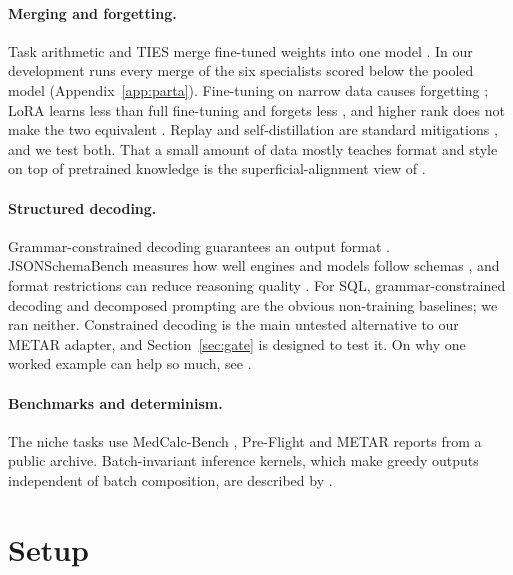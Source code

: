 \documentclass[11pt]{article}
\begin{document}
\paragraph{Merging and forgetting.} Task arithmetic and TIES merge fine-tuned weights into one model
\citep{ilharco2023taskarith,yadav2023ties}. In our development runs every merge of the six specialists scored below
the pooled model (Appendix~\ref{app:parta}). Fine-tuning on narrow data causes forgetting \citep{luo2023forgetting};
LoRA learns less than full fine-tuning and forgets less \citep{biderman2024loralearnsless}, and higher rank does not
make the two equivalent \citep{shuttleworth2024illusion}. Replay and self-distillation are standard mitigations
\citep{yang2024sdft}, and we test both. That a small amount of data mostly teaches format and style on top of
pretrained knowledge is the superficial-alignment view of \citet{zhou2023lima}.

\paragraph{Structured decoding.} Grammar-constrained decoding guarantees an output format
\citep{willard2023outlines,dong2025xgrammar}. JSONSchemaBench measures how well engines and models follow schemas
\citep{geng2025jsonschemabench}, and format restrictions can reduce reasoning quality \citep{tam2024speakfreely}.
For SQL, grammar-constrained decoding \citep{scholak2021picard} and decomposed prompting \citep{pourreza2023dinsql}
are the obvious non-training baselines; we ran neither. Constrained decoding is the main untested alternative to our
METAR adapter, and Section~\ref{sec:gate} is designed to test it. On why one worked example can help so much, see
\citet{min2022demonstrations}.

\paragraph{Benchmarks and determinism.} The niche tasks use MedCalc-Bench \citep{khandekar2024medcalc}, Pre-Flight
\citep{brooker2026preflight} and METAR reports from a public archive. Batch-invariant inference kernels, which make
greedy outputs independent of batch composition, are described by \citet{he2025nondeterminism}.

\section{Setup}
\end{document}
